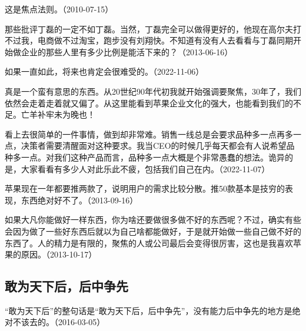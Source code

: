 这是焦点法则。（2010-07-15）


那些批评丁磊的一定不如丁磊。当然，丁磊完全可以做得更好的，他现在高尔夫打不过我，电商做不过淘宝，跑步没有刘翔快。不知道有没有人去看看与丁磊同期开始做企业的那些人里有多少比例是能活下来的？（2013-06-16）


如果一直如此，将来也肯定会很难受的。（2022-11-06）

真是一个蛮有意思的东西。从20世纪90年代初我就开始强调要聚焦，30年了，我们依然会走着走着就又偏了。从这里能看到苹果企业文化的强大，也能看到我们的不足。亡羊补牢未为晚也！


看上去很简单的一件事情，做到却非常难。销售一线总是会要求品种多一点再多一点，决策者需要清醒面对这种要求。我当CEO的时候几乎每天都会有人说希望品种多一点。对我们这种产品而言，品种多一点大概是个非常愚蠢的想法。诡异的是，大家看看有多少人对此乐此不疲，包括我们自己在内。（2022-11-07）


苹果现在一年都要推两款了，说明用户的需求比较分散。推50款基本是技穷的表现，东西绝对好不了。（2013-09-16）


如果大凡你能做好一样东西，你为啥还要做很多做不好的东西呢？不过，确实有些会因为做了一些好东西后就以为自己啥都能做好，于是就开始做一些自己做不好的东西了。人的精力是有限的，聚焦的人或公司最后会变得很厉害，这也是我喜欢苹果的原因。（2013-10-17）

\subsection{敢为天下后，后中争先}

“敢为天下后”的整句话是“敢为天下后，后中争先”，没有能力后中争先的地方是绝对不该去的。（2016-03-05）

